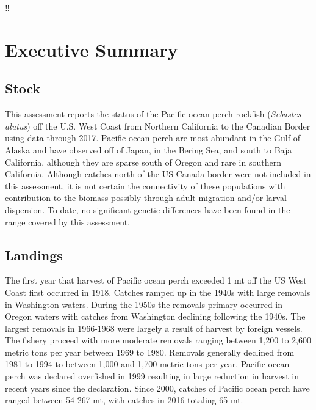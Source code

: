 \documentclass[12pt,]{article}
\begin{document}
{
\setcounter{tocdepth}{4}
\tableofcontents
}
\setlength{\parskip}{5mm plus1mm minus1mm} \pagebreak

\setcounter{page}{1} \renewcommand{\thefigure}{\alph{figure}}
‼\renewcommand{\thetable}{\alph{table}}

\section*{Executive Summary}\label{executive-summary}

\subsection*{Stock}\label{stock}

This assessment reports the status of the Pacific ocean perch rockfish
(\emph{Sebastes alutus}) off the U.S. West Coast from Northern
California to the Canadian Border using data through 2017. Pacific ocean
perch are most abundant in the Gulf of Alaska and have observed off of
Japan, in the Bering Sea, and south to Baja California, although they
are sparse south of Oregon and rare in southern California. Although
catches north of the US-Canada border were not included in this
assessment, it is not certain the connectivity of these populations with
contribution to the biomass possibly through adult migration and/or
larval dispersion. To date, no significant genetic differences have been
found in the range covered by this assessment.

\subsection*{Landings}\label{landings}

The first year that harvest of Pacific ocean perch exceeded 1 mt off the
US West Coast first occurred in 1918. Catches ramped up in the 1940s
with large removals in Washington waters. During the 1950s the removals
primary occurred in Oregon waters with catches from Washington declining
following the 1940s. The largest removals in 1966-1968 were largely a
result of harvest by foreign vessels. The fishery proceed with more
moderate removals ranging between 1,200 to 2,600 metric tons per year
between 1969 to 1980. Removals generally declined from 1981 to 1994 to
between 1,000 and 1,700 metric tons per year. Pacific ocean perch was
declared overfished in 1999 resulting in large reduction in harvest in
recent years since the declaration. Since 2000, catches of Pacific ocean
perch have ranged between 54-267 mt, with catches in 2016 totaling 65
mt.
\end{document}
